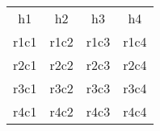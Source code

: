 \begin{tabular}{|c|c|c|c|}
h1 & h2 & h3 & h4 \\
r1c1 & r1c2 & r1c3 & r1c4 \\
r2c1 & r2c2 & r2c3 & r2c4 \\
r3c1 & r3c2 & r3c3 & r3c4 \\
r4c1 & r4c2 & r4c3 & r4c4 \\
\end{tabular}